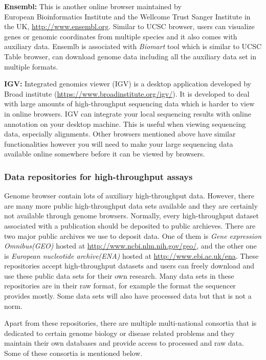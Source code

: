 \documentclass[12pt,]{krantz}
\theoremstyle{definition}
\theoremstyle{definition}
\theoremstyle{definition}
\theoremstyle{remark}
\begin{document}
\textbf{Ensembl:} This is another online browser maintained by\\
European Bioinformatics Institute and the Wellcome Trust Sanger
Institute in the UK, \url{http://www.ensembl.org}. Similar to UCSC
browser, users can visualize genes or genomic coordinates from multiple
species and it also comes with auxiliary data. Ensemlb is associated
with \emph{Biomart} tool which is similar to UCSC Table browser, can
download genome data including all the auxiliary data set in multiple
formats.

\textbf{IGV:} Integrated genomics viewer (IGV) is a desktop application
developed by Broad institute
(\url{https://www.broadinstitute.org/igv/}). It is developed to deal
with large amounts of high-throughput sequencing data which is harder to
view in online browsers. IGV can integrate your local sequencing results
with online annotation on your desktop machine. This is useful when
viewing sequencing data, especially alignments. Other browsers mentioned
above have similar functionalities however you will need to make your
large sequencing data available online somewhere before it can be viewed
by browsers.

\hypertarget{data-repositories-for-high-throughput-assays}{%
\subsubsection{Data repositories for high-throughput
assays}\label{data-repositories-for-high-throughput-assays}}

Genome browser contain lots of auxiliary high-throughput data. However,
there are many more public high-throughput data sets available and they
are certainly not available through genome browsers. Normally, every
high-throughput dataset associated with a publication should be
deposited to public archieves. There are two major public archives we
use to deposit data. One of them is \emph{Gene expression Omnibus(GEO) }
hosted at \url{http://www.ncbi.nlm.nih.gov/geo/}, and the other one is
\emph{European nucleotide archive(ENA)} hosted at
\url{http://www.ebi.ac.uk/ena}. These repositories accept
high-throughput datasets and users can freely download and use these
public data sets for their own research. Many data sets in these
repositories are in their raw format, for example the format the
sequencer provides mostly. Some data sets will also have processed data
but that is not a norm.

Apart from these repositories, there are multiple multi-national
consortia that is dedicated to certain genome biology or disease related
problems and they maintain their own databases and provide access to
processed and raw data. Some of these consortia is mentioned below.
\end{document}
